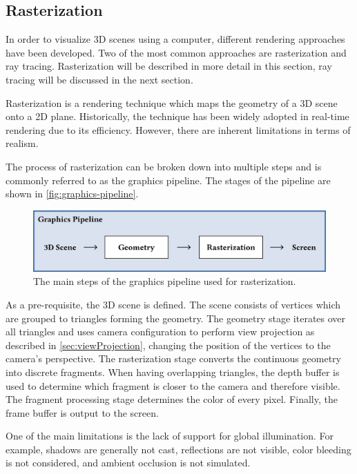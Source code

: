 \subsection{Rasterization}
\label{ch:rasterizationTheory}

In order to visualize 3D scenes using a computer, different rendering approaches have been developed. Two of the most common approaches are rasterization and ray tracing. Rasterization will be described in more detail in this section, ray tracing will be discussed in the next section.

Rasterization is a rendering technique which maps the geometry of a 3D scene onto a 2D plane. Historically, the technique has been widely adopted in real-time rendering due to its efficiency. However, there are inherent limitations in terms of realism.

The process of rasterization can be broken down into multiple steps and is commonly referred to as the graphics pipeline. The stages of the pipeline are shown in \autoref{fig:graphics-pipeline}.

\begin{figure}[H]
  \includegraphics[width=\columnwidth]{resources/graphics-pipeline.png}
  \caption{The main steps of the graphics pipeline used for rasterization.}
  \label{fig:graphics-pipeline}
\end{figure}

As a pre-requisite, the 3D scene is defined. The scene consists of vertices which are grouped to triangles forming the geometry. The geometry stage iterates over all triangles and uses camera configuration to perform view projection as described in \autoref{sec:viewProjection}, changing the position of the vertices to the camera's perspective. The rasterization stage converts the continuous geometry into discrete fragments. When having overlapping triangles, the depth buffer is used to determine which fragment is closer to the camera and therefore visible. The fragment processing stage determines the color of every pixel. Finally, the frame buffer is output to the screen.

One of the main limitations is the lack of support for global illumination. For example, shadows are generally not cast, reflections are not visible, color bleeding is not considered, and ambient occlusion is not simulated.

